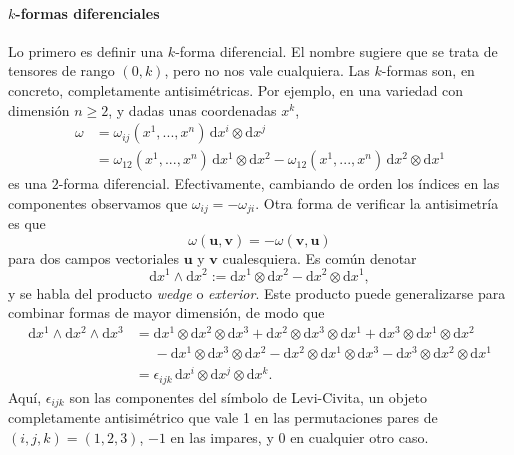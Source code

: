 \paragraph{\(k\)-formas diferenciales}Lo primero es definir una \(k\)-forma diferencial. El nombre sugiere que se trata de tensores de rango \((0, k)\), pero no nos vale cualquiera. Las \(k\)-formas son, en concreto, completamente antisimétricas. Por ejemplo, en una variedad con dimensión \(n\geq 2\), y dadas unas coordenadas \(x^k\),
\begin{align}
    \nonumber
    \omega &= \omega_{ij}\left(x^1,...,x^n\right)\, \mathrm{d}x^i\otimes\mathrm{d}x^j \\
    &= \omega_{12}\left(x^1,...,x^n\right)\,\mathrm{d}x^1 \otimes\mathrm{d}x^2 - \omega_{12}\left(x^1,...,x^n\right)\,\mathrm{d}x^2 \otimes\mathrm{d}x^1
\end{align}
es una \(2\)-forma diferencial. Efectivamente, cambiando de orden los índices en las componentes observamos que \(\omega_{ij} = -\omega_{ji}\). Otra forma de verificar la antisimetría es que 
\begin{equation}
    \omega(\mathbf{u}, \mathbf{v}) = -\omega(\mathbf{v}, \mathbf{u})
\end{equation}
para dos campos vectoriales \(\mathbf{u}\) y \(\mathbf{v}\) cualesquiera. Es común denotar
\begin{equation}
    \mathrm{d}x^1 \wedge\mathrm{d}x^2 := \mathrm{d}x^1 \otimes\mathrm{d}x^2 - \mathrm{d}x^2 \otimes\mathrm{d}x^1,
\end{equation}
y se habla del producto \textit{wedge} o \emph{exterior}. Este producto puede generalizarse para combinar formas de mayor dimensión, de modo que 
\begin{align}
    \nonumber
    \mathrm{d}x^1 \wedge\mathrm{d}x^2 \wedge \mathrm{d}x^3 &= \mathrm{d}x^1 \otimes\mathrm{d}x^2\otimes \mathrm{d}x^3 + \mathrm{d}x^2 \otimes\mathrm{d}x^3\otimes \mathrm{d}x^1 + \mathrm{d}x^3 \otimes\mathrm{d}x^1\otimes \mathrm{d}x^2\\
    \nonumber
    &\phantom{=}-\mathrm{d}x^1 \otimes\mathrm{d}x^3\otimes \mathrm{d}x^2 - \mathrm{d}x^2 \otimes\mathrm{d}x^1\otimes \mathrm{d}x^3 - \mathrm{d}x^3 \otimes\mathrm{d}x^2\otimes \mathrm{d}x^1 \\
    &= \epsilon_{ijk}\, \mathrm{d}x^i \otimes\mathrm{d}x^j\otimes \mathrm{d}x^k.
\end{align}
Aquí, \(\epsilon_{ijk}\) son las componentes del símbolo de Levi-Civita, un objeto completamente antisimétrico que vale 1 en las permutaciones pares de \((i,j,k)=(1,2,3)\), \(-1\) en las impares, y 0 en cualquier otro caso.

